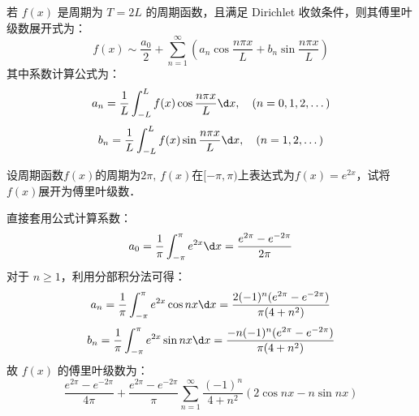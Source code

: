 \documentclass[12pt, a4paper, oneside, UTF8]{ctexbook}
\begin{document}
\begin{corollary}[周期为 $T=2L$ 的傅里叶级数]
    若 $f(x)$ 是周期为 $T=2L$ 的周期函数，且满足 Dirichlet 收敛条件，则其傅里叶级数展开式为：
    \[ f(x) \sim \frac{a_0}{2} + \sum_{n=1}^\infty \left( a_n \cos \frac{n\pi x}{L} + b_n \sin \frac{n\pi x}{L} \right) \]
    其中系数计算公式为：
    \[ a_n = \frac{1}{L} \int_{-L}^{L} f(x) \cos \frac{n\pi x}{L} \d x, \quad (n=0, 1, 2, \dots) \]
    \[ b_n = \frac{1}{L} \int_{-L}^{L} f(x) \sin \frac{n\pi x}{L} \d x, \quad (n=1, 2, \dots) \]
\end{corollary}

\begin{example}
    设周期函数$f(x)$的周期为$2\pi,\,f(x)$在$[-\pi,\pi)$上表达式为$f(x)=e^{2x}$，试将$f(x)$展开为傅里叶级数．
\end{example}
\begin{solution}
    直接套用公式计算系数：
    \[a_0 = \frac{1}{\pi} \int_{-\pi}^\pi e^{2x} \d x = \frac{e^{2\pi} - e^{-2\pi}}{2\pi}\]
    对于 $n \ge 1$，利用分部积分法可得：
    \[a_n = \frac{1}{\pi} \int_{-\pi}^\pi e^{2x} \cos nx \d x = \frac{2(-1)^n(e^{2\pi} - e^{-2\pi})}{\pi(4+n^2)}\]
    \[b_n = \frac{1}{\pi} \int_{-\pi}^\pi e^{2x} \sin nx \d x = \frac{-n(-1)^n(e^{2\pi} - e^{-2\pi})}{\pi(4+n^2)}\]
    故 $f(x)$ 的傅里叶级数为：
    \[ \boxed{ \frac{e^{2\pi} - e^{-2\pi}}{4\pi} + \frac{e^{2\pi} - e^{-2\pi}}{\pi} \sum_{n=1}^\infty \frac{(-1)^n}{4+n^2} (2\cos nx - n\sin nx) } \]
\end{solution}
\end{document}
